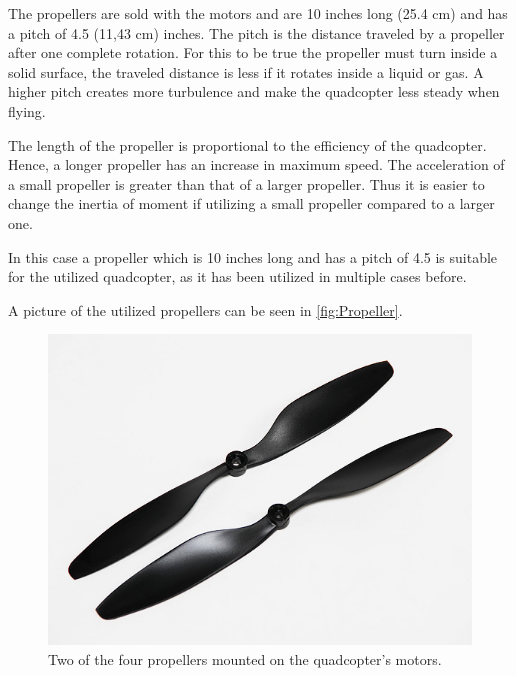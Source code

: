 The propellers are sold with the motors and are 10 inches long (25.4 cm) and has a pitch of 4.5 (11,43 cm) inches. The pitch is the distance traveled by a propeller after one complete rotation. For this to be true the propeller must turn inside a solid surface, the traveled distance is less if it rotates inside a liquid or gas.  A higher pitch creates more turbulence and make the quadcopter less steady when flying. 

The length of the propeller is proportional to the efficiency of the quadcopter. Hence, a longer propeller has an increase in maximum speed. The acceleration of a small propeller is greater than that of a larger propeller. Thus it is easier to change the inertia of moment if utilizing a small propeller compared to a larger one.  

In this case a propeller which is 10 inches long and has a pitch of 4.5 is suitable for the utilized quadcopter, as it has been utilized in multiple cases before. 

A picture of the utilized propellers can be seen in \autoref{fig:Propeller}.

\begin{figure}[H]
	\centering
	\includegraphics[scale=0.4]{figures/propeller.png}
	\caption{Two of the four propellers mounted on the quadcopter's motors.}
	\label{fig:Propeller}
\end{figure}

